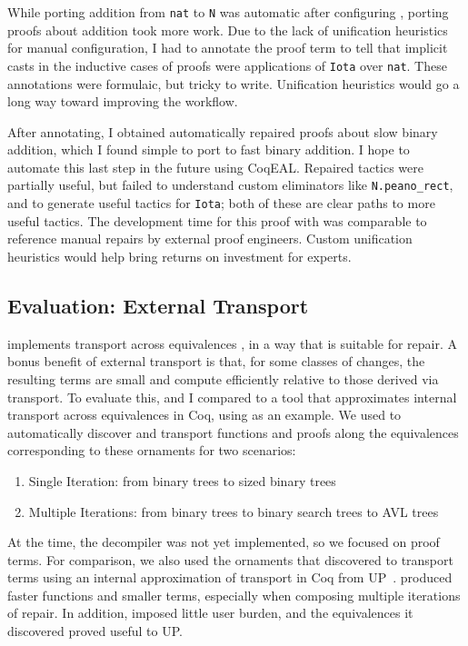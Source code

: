 While porting addition from \lstinline{nat} to \lstinline{N} was automatic after configuring \toolnamec,
porting proofs about addition took more work.
Due to the lack of unification heuristics for manual configuration,
I had to annotate the proof term to tell \toolnamec that implicit casts in the inductive cases of proofs were applications of \lstinline{Iota}
over \lstinline{nat}.
These annotations were formulaic, but tricky to write.
Unification heuristics would go a long way toward improving the workflow. %

After annotating, I obtained automatically repaired proofs about slow binary addition,
which I found simple to port to fast binary addition.
I hope to automate this last step in the future using CoqEAL. %
Repaired tactics were partially useful, but failed to understand custom eliminators like \lstinline{N.peano_rect}, and to generate useful
tactics for \lstinline{Iota}; both of these are clear paths to more useful tactics.
The development time for this proof with \toolnamec was comparable to reference manual repairs by external proof engineers.
Custom unification heuristics would help bring returns on investment for experts.

\subsection{Evaluation: External Transport}
\label{sec:eval}

\toolnamec implements transport across equivalences , in a way that is suitable for repair.
A bonus benefit of external transport is that, for some classes of changes,
the resulting terms are small and compute efficiently relative to those derived via  transport.
To evaluate this,  and I compared \toolnamec to a tool that approximates internal transport across equivalences in Coq,
using  as an example.
We used \toolnamec to automatically discover and transport functions and proofs along the equivalences
corresponding to these ornaments for two scenarios:

\begin{enumerate}
\item Single Iteration: from binary trees to sized binary trees
\item Multiple Iterations: from binary trees to binary search trees to AVL trees
\end{enumerate}
At the time, the decompiler was not yet implemented, so we focused on proof terms.
For comparison, we also used the ornaments that \toolnamec discovered to transport terms using an internal approximation of transport in Coq from UP~\cite{tabareau2017equivalences}.
\toolnamec produced faster functions and smaller terms, especially when composing multiple iterations of repair.
In addition, \toolnamec imposed little user burden, and the equivalences it discovered proved useful to UP.

